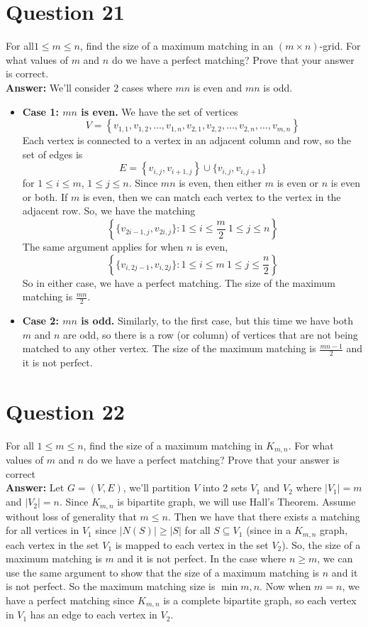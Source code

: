 \documentclass[openany]{report}
\begin{document}
\section{Question 21}
For all$ 1 \leq m \leq n$, find the size of a maximum matching in an $(m \times n)$-grid. For what values of $m$ and $n$ do we have a perfect matching? Prove that your answer is correct.\\[2ex]
\textbf{Answer:} We'll consider 2 cases where $mn$ is even and $mn$ is odd.
\begin{itemize}
    \item \textbf{Case 1: $mn$ is even.} We have the set of vertices
    \[V = \left\{v_{1,1}, v_{1,2}, \ldots, v_{1,n}, v_{2,1}, v_{2,2}, \ldots, v_{2,n}, \ldots, v_{m,n}\right\}\]
    Each vertex is connected to a vertex in an adjacent column and row, so the set of edges is 
    \[E = \left\{v_{i,j}, v_{i+1,j}\right\} \cup \{v_{i,j}, v_{i,j+1}\}\]
    for $1 \leq i \leq m$, $1 \leq j \leq n$. Since $mn$ is even, then either $m$ is even or $n$ is even or both. If $m$ is even, then we can match each vertex to the vertex in the adjacent row. So, we have the matching 
    \[\left\{\{v_{2i-1, j}, v_{2i,j}\} : 1 \leq i \leq \frac{m}{2} \ 1 \leq j \leq n\right\}\]
    The same argument applies for when $n$ is even, 
    \[\left\{\{v_{i, 2j-1}, v_{i,2j}\} : 1 \leq i \leq m \ 1 \leq j \leq  \frac{n}{2}\right\}\]
    So in either case, we have a perfect matching. The size of the maximum matching is $\frac{mn}{2}$.
    \item \textbf{Case 2: $mn$ is odd.} Similarly, to the first case, but this time we have both $m$ and $n$ are odd, so there is a row (or column) of vertices that are not being matched to any other vertex. The size of the maximum matching is $\frac{mn-1}{2}$ and it is not perfect.
\end{itemize}
\section{Question 22}
For all $1 \leq m \leq n$, find the size of a maximum matching in $K_{m,n}$. For what values of $m$ and $n$ do we have a perfect matching? Prove that your answer is correct\\[2ex]
\textbf{Answer:} Let $G = (V,E)$, we'll partition $V$ into 2 sets $V_1$ and $V_2$ where $|V_1| = m$ and $|V_2| = n$. Since $K_{m,n}$ is bipartite graph, we will use Hall's Theorem. Assume without loss of generality that $m \leq n$. Then we have that there exists a matching for all vertices in $V_1$ since $|N(S)| \geq |S|$ for all $S \subseteq V_1$ (since in a $K_{m,n}$ graph, each vertex in the set $V_1$ is mapped to each vertex in the set $V_2$). So, the size of a maximum matching is $m$ and it is not perfect. In the case where $n \geq m$, we can use the same argument to show that the size of a maximum matching is $n$ and it is not perfect. So the maximum matching size is $\min{m,n}$. Now when $m = n$, we have a perfect matching since $K_{m,n}$ is a complete bipartite graph, so each vertex in $V_1$ has an edge to each vertex in $V_2$.
\end{document}
